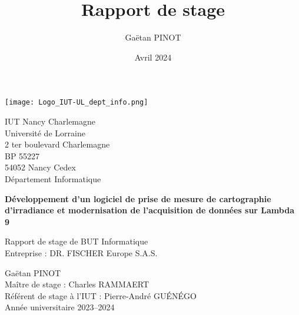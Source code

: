 \documentclass[12pt]{article}
\title{\Large\textbf{Rapport de stage}}
\author{Gaëtan PINOT}
\date{Avril 2024}
\begin{document}

\begin{center}
	\texttt{[image: Logo\_IUT-UL\_dept\_info.png]}
\end{center}

\vspace{1cm}

\noindent
{\large
IUT Nancy Charlemagne\\
Université de Lorraine\\
2 ter boulevard Charlemagne\\
BP 55227\\
54052 Nancy Cedex\\[5mm]
Département Informatique
}

\vspace{5cm}

\begin{center}
	{\huge
	\textbf{Développement d'un logiciel de prise de mesure de cartographie d'irradiance et modernisation de l'acquisition de données sur Lambda 9}
	}
\end{center}

\vspace{5cm}

{\Large
\noindent
Rapport de stage de BUT Informatique\\
Entreprise : DR. FISCHER Europe S.A.S.
}

\vfill

{\Large
\noindent
Gaëtan PINOT\\
Maître de stage : Charles RAMMAERT\\
Référent de stage à l'IUT : Pierre-André GUÉNÉGO\\
Année universitaire 2023--2024
}
\end{document}
